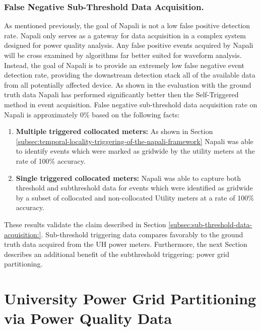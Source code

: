\subsubsection{False Negative Sub-Threshold Data Acquisition.}

As mentioned previously, the goal of Napali is not a low false positive detection rate.
Napali only serves as a gateway for data acquisition in a complex system designed for power quality analysis.
Any false positive events acquired by Napali will be cross examined by algorithms far better suited for waveform analysis.
Instead, the goal of Napali is to provide an extremely low false negative event detection rate, providing the downstream detection stack all of the available data from all potentially affected device.
As shown in the evaluation with the ground truth data Napali has performed significantly better then the Self-Triggered method in event acquisition.
False negative sub-threshold data acquisition rate on Napali is approximately 0\% based on the following facts:
\begin{enumerate}
    \item \textbf{Multiple triggered collocated meters:} As shown in Section \ref{subsec:temporal-locality-triggering-of-the-napali-framework} Napali was able to identify events which were marked as gridwide by the utility meters at the rate of 100\% accuracy.
    \item \textbf{Single triggered collocated meters:} Napali was able to capture both threshold and subthreshold data for events which were identified as gridwide by a subset of collocated and non-collocated Utility meters at a rate of 100\% accuracy.
\end{enumerate}

These results validate the claim described in Section \ref{subsec:sub-threshold-data-acquisition:}.
Sub-threshold triggering data compares favorably to the ground truth data acquired from the UH power meters.
Furthermore, the next Section describes an additional benefit of the subthreshold triggering: power grid partitioning.

\section{University Power Grid Partitioning via Power Quality Data}\label{sec:university-power-grid-partitioning-via-power-quality-data}

